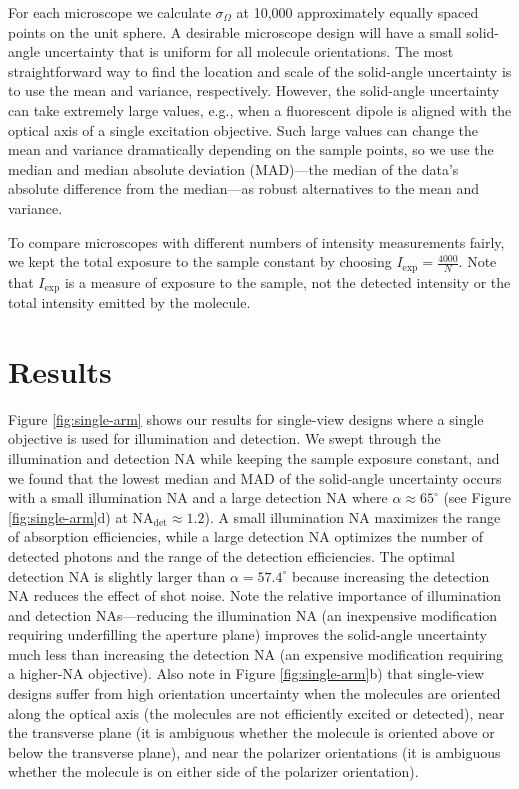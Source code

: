 \documentclass[10pt]{article}
\begin{document}
For each microscope we calculate $\sigma_{\Omega}$ at 10,000 approximately
equally spaced points on the unit sphere. A desirable microscope design will
have a small solid-angle uncertainty that is uniform for all molecule
orientations. The most straightforward way to find the location and scale of the
solid-angle uncertainty is to use the mean and variance, respectively. However,
the solid-angle uncertainty can take extremely large values, e.g., when a
fluorescent dipole is aligned with the optical axis of a single excitation
objective. Such large values can change the mean and variance dramatically
depending on the sample points, so we use the median and median absolute
deviation (MAD)---the median of the data's absolute difference from the
median---as robust alternatives to the mean and variance.

To compare microscopes with different numbers of intensity measurements fairly,
we kept the total exposure to the sample constant by choosing
$I_{\text{exp}} = \frac{4000}{N}$. Note that $I_{\text{exp}}$ is a measure of
exposure to the sample, not the detected intensity or the total intensity
emitted by the molecule.

\section{Results}\label{results}
Figure \ref{fig:single-arm} shows our results for single-view designs where a
single objective is used for illumination and detection. We swept through the
illumination and detection NA while keeping the sample exposure constant, and we
found that the lowest median and MAD of the solid-angle uncertainty occurs with
a small illumination NA and a large detection NA where
$\alpha \approx 65^{\circ}$ (see Figure \ref{fig:single-arm}d) at
NA${}_{\text{det}} \approx 1.2$). A small illumination NA maximizes the range of
absorption efficiencies, while a large detection NA optimizes the number of
detected photons and the range of the detection efficiencies. The optimal
detection NA is slightly larger than $\alpha = 57.4^{\circ}$ because increasing
the detection NA reduces the effect of shot noise. Note the relative importance
of illumination and detection NAs---reducing the illumination NA (an inexpensive
modification requiring underfilling the aperture plane) improves the solid-angle
uncertainty much less than increasing the detection NA (an expensive
modification requiring a higher-NA objective). Also note in Figure
\ref{fig:single-arm}b) that single-view designs suffer from high orientation
uncertainty when the molecules are oriented along the optical axis (the
molecules are not efficiently excited or detected), near the transverse plane
(it is ambiguous whether the molecule is oriented above or below the transverse
plane), and near the polarizer orientations (it is ambiguous whether the
molecule is on either side of the polarizer orientation).
\end{document}
